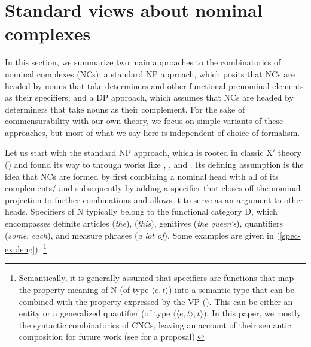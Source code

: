 \documentclass[output=paper,colorlinks,citecolor=brown]{langscibook}
\begin{document}
\section{Standard views about nominal complexes}\label{sec:stand:deng}

In this section, we summarize two main approaches to the combinatorics of nominal complexes (NCs): a standard NP approach, which posits that NCs are headed by nouns that take determiners and other functional prenominal elements as their specifiers; and a DP approach, which assumes that NCs are headed by determiners that take nouns as their complement.  For the sake of commensurability with our own theory,  we focus on simple  variants of  these approaches, but most of what we say here is independent of choice of formalism. 

Let us start with the standard NP approach, which is rooted in classic X$'$ theory (\citealt{Chomsky1970a, Jackendoff77a}) and found its way to  through works like \citet[139--143]{Pollard&Sag87a}, \citet[34]{Ginzburg2000a}, \citet[102]{Sag&Co03a} and \citet[84]{Levine17a}. Its defining assumption is the idea that NCs are formed by first combining a nominal head with all of its complements/ and subsequently by adding a specifier that closes off the nominal projection to further combinations and allows it to serve as an argument to other heads. Specifiers of N typically belong to the functional category D, which encompasses definite articles (\textit{the}),   (\textit{this}), genitives (\textit{the queen's}), quantifiers  (\textit{some}, \textit{each}), and measure phrases (\textit{a lot of}). Some examples are given in (\ref{spec-ex:deng}).%
%
\footnote{Semantically, it is generally assumed that specifiers are functions that map the property meaning of N (of type $\langle e,t\rangle$) into a semantic type that can be combined with the property expressed by the VP (\citealt{Heim1998a}). This can be either an entity or a generalized quantifier (of type $\langle\langle e,t\rangle, t\rangle$).  In this paper, we  mostly the syntactic combinatorics of CNCs, leaving an account of their semantic composition for future work (see \citealt{Krifka95a} for a proposal).} %
%
\end{document}
